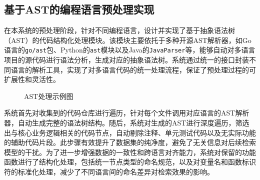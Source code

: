 \documentclass[UTF8,a4paper,12pt]{ctexart}
\numberwithin{equation}{section}
\begin{document}
\subsection{基于AST的编程语言预处理实现}
在本系统的预处理阶段，针对不同编程语言，设计并实现了基于抽象语法树（AST）的代码结构化处理模块。该模块主要依托于多种开源AST解析器，如Go语言的\texttt{go/ast}包、Python的\texttt{ast}模块以及Java的\texttt{JavaParser}等，能够自动对多语言项目的源代码进行语法分析，生成对应的抽象语法树。系统通过统一的接口封装不同语言的解析工具，实现了对多语言代码的统一处理流程，保证了预处理过程的可扩展性和灵活性。\par
\begin{figure}[H]
	\caption{AST处理示例图}
	\label{ast_example}
\end{figure}
系统首先对收集到的代码仓库进行遍历，针对每个文件调用对应语言的AST解析器，自动生成完整的语法树结构。随后，系统对生成的AST进行深度遍历，筛选出与核心业务逻辑相关的代码节点，自动剔除注释、单元测试代码以及无实际功能的辅助代码片段。此步骤有效提升了数据集的纯净度，避免了无关信息对后续检索模型的干扰。为了进一步增强数据的一致性和跨语言对齐能力，系统对保留的功能函数进行了结构化处理，包括统一节点类型的命名规范，以及对变量名和函数标识符的标准化处理，减少了不同语言间的命名差异对检索效果的影响。\par
\end{document}
